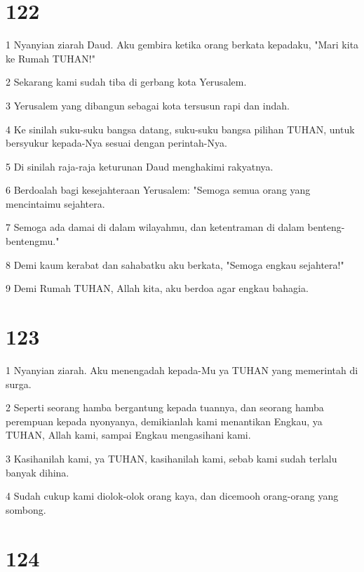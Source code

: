 \chapter{122}

\par 1 Nyanyian ziarah Daud. Aku gembira ketika orang berkata kepadaku, "Mari kita ke Rumah TUHAN!"
\par 2 Sekarang kami sudah tiba di gerbang kota Yerusalem.
\par 3 Yerusalem yang dibangun sebagai kota tersusun rapi dan indah.
\par 4 Ke sinilah suku-suku bangsa datang, suku-suku bangsa pilihan TUHAN, untuk bersyukur kepada-Nya sesuai dengan perintah-Nya.
\par 5 Di sinilah raja-raja keturunan Daud menghakimi rakyatnya.
\par 6 Berdoalah bagi kesejahteraan Yerusalem: "Semoga semua orang yang mencintaimu sejahtera.
\par 7 Semoga ada damai di dalam wilayahmu, dan ketentraman di dalam benteng-bentengmu."
\par 8 Demi kaum kerabat dan sahabatku aku berkata, "Semoga engkau sejahtera!"
\par 9 Demi Rumah TUHAN, Allah kita, aku berdoa agar engkau bahagia.

\chapter{123}

\par 1 Nyanyian ziarah. Aku menengadah kepada-Mu ya TUHAN yang memerintah di surga.
\par 2 Seperti seorang hamba bergantung kepada tuannya, dan seorang hamba perempuan kepada nyonyanya, demikianlah kami menantikan Engkau, ya TUHAN, Allah kami, sampai Engkau mengasihani kami.
\par 3 Kasihanilah kami, ya TUHAN, kasihanilah kami, sebab kami sudah terlalu banyak dihina.
\par 4 Sudah cukup kami diolok-olok orang kaya, dan dicemooh orang-orang yang sombong.

\chapter{124}


